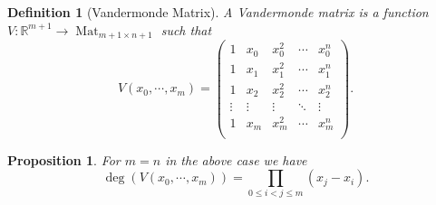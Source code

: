\documentclass[10pt]{article}
\newtheorem{proposition}{Proposition}[section]
\newtheorem{definition}{Definition}[section]
\numberwithin{equation}{theorem}
\DeclareMathOperator{\Mat}{Mat}
\newcommand{\R}[0]{\mathbb{R}}
\begin{document}
\begin{definition}[Vandermonde Matrix]
  A Vandermonde matrix is a function $V:\R^{m+1}\to\Mat_{m+1\times n+1}$ such that 
  \begin{equation*}
    V(x_0,\cdots,x_m) = 
    \begin{pmatrix}
      1 & x_0 & x_0^2 & \cdots & x_0^n \\
      1 & x_1 & x_1^2 & \cdots & x_1^n \\
      1 & x_2 & x_2^2 & \cdots & x_2^n \\
      \vdots & \vdots & \vdots & \ddots & \vdots \\
      1 & x_m & x_m^2 & \cdots & x_m^n \\
    \end{pmatrix}.
  \end{equation*}
\end{definition}

\begin{proposition}
  For $m = n$ in the above case we have 
  \begin{equation*}
    \deg(V(x_0,\cdots,x_m)) = \prod_{0\leq i < j \leq m}(x_j-x_i).
  \end{equation*}
  \label{vandermonde_determinant}
\end{proposition}
\end{document}
